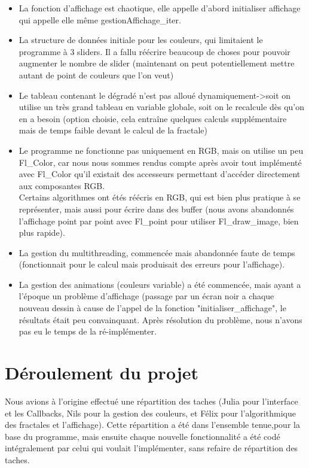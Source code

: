\documentclass[a4paper,11pt]{article} \usepackage[T1]{fontenc} \usepackage[utf8]{inputenc} \usepackage[francais]{babel}
\begin{document}
\begin{itemize}
\item La fonction d'affichage est chaotique, elle appelle d'abord initialiser affichage qui appelle elle même gestionAffichage\_iter.%
\item La structure de données initiale pour les couleurs, qui limitaient le programme à 3 sliders. Il a fallu réécrire beaucoup de choses pour pouvoir augmenter le nombre de slider (maintenant on peut potentiellement mettre autant de point de couleurs que l'on veut)
\item Le tableau contenant le dégradé n'est pas alloué dynamiquement->soit on utilise un très grand tableau en variable globale, soit on le recalcule dès qu'on en a besoin (option choisie, cela entraîne quelques calculs supplémentaire mais de temps faible devant le calcul de la fractale)
\item Le programme ne fonctionne pas uniquement en RGB, mais on utilise un peu Fl\_Color, car nous nous sommes rendus compte après avoir tout implémenté avec Fl\_Color qu'il existait des accesseurs permettant d’accéder directement aux composantes RGB.\\
Certains algorithmes ont étés réécris en RGB, qui est bien plus pratique à se représenter, mais aussi pour écrire dans des buffer (nous avons abandonnés l'affichage point par point avec Fl\_point pour utiliser Fl\_draw\_image, bien plus rapide).
\item La gestion du multithreading, commencée mais abandonnée faute de temps (fonctionnait pour le calcul mais produisait des erreurs pour l'affichage).
\item La gestion des animations (couleurs variable) a été commencée, mais ayant a l'époque un problème d'affichage (passage par un écran noir a chaque nouveau dessin à cause de l'appel de la fonction "initialiser\_affichage", le résultats était peu convainquant. Après résolution du problème, nous n'avons pas eu le temps de la ré-implémenter.
\end{itemize}


\section{Déroulement du projet}
Nous avions à l'origine effectué une répartition des taches (Julia pour l'interface et les Callbacks, Nils pour la gestion des couleurs, et Félix pour l'algorithmique des fractales et l'affichage). Cette répartition a été dans l'ensemble tenue,pour la base du programme, mais ensuite chaque nouvelle fonctionnalité a été codé intégralement par celui qui voulait l'implémenter, sans refaire de répartition des taches. 
\end{document}
